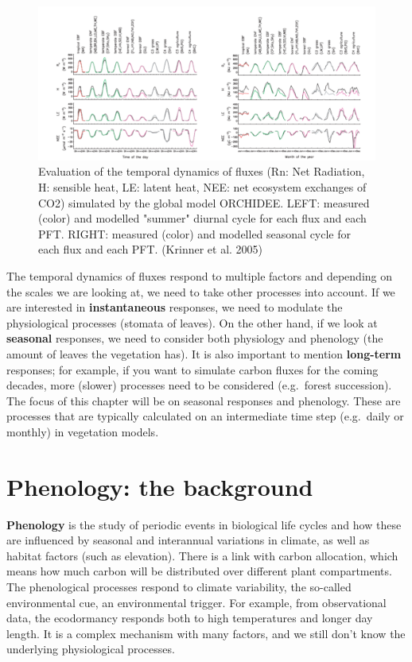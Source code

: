 \documentclass[
  12pt,
  oneside]{book}
\begin{document}
\begin{figure}

{\centering \includegraphics[width=0.8\linewidth]{figures/chap4/f41_Krinner} 

}

\caption{Evaluation of the temporal dynamics of fluxes (Rn: Net Radiation, H: sensible heat, LE: latent heat, NEE: net ecosystem exchanges of CO2) simulated by the global model ORCHIDEE. LEFT: measured (color) and modelled "summer" diurnal cycle for each flux and each PFT. RIGHT: measured (color) and modelled seasonal cycle for each flux and each PFT. (Krinner et al. 2005)}\label{fig:f41}
\end{figure}

The temporal dynamics of fluxes respond to multiple factors and depending on the scales we are looking at, we need to take other processes into account. If we are interested in \textbf{instantaneous} responses, we need to modulate the physiological processes (stomata of leaves). On the other hand, if we look at \textbf{seasonal} responses, we need to consider both physiology and phenology (the amount of leaves the vegetation has). It is also important to mention \textbf{long-term} responses; for example, if you want to simulate carbon fluxes for the coming decades, more (slower) processes need to be considered (e.g.~forest succession).
The focus of this chapter will be on seasonal responses and phenology. These are processes that are typically calculated on an intermediate time step (e.g.~daily or monthly) in vegetation models.

\hypertarget{phenology-the-background}{%
\section{Phenology: the background}\label{phenology-the-background}}

\textbf{Phenology} is the study of periodic events in biological life cycles and how these are influenced by seasonal and interannual variations in climate, as well as habitat factors (such as elevation). There is a link with carbon allocation, which means how much carbon will be distributed over different plant compartments.
The phenological processes respond to climate variability, the so-called environmental cue, an environmental trigger. For example, from observational data, the ecodormancy responds both to high temperatures and longer day length. It is a complex mechanism with many factors, and we still don't know the underlying physiological processes.
\end{document}
